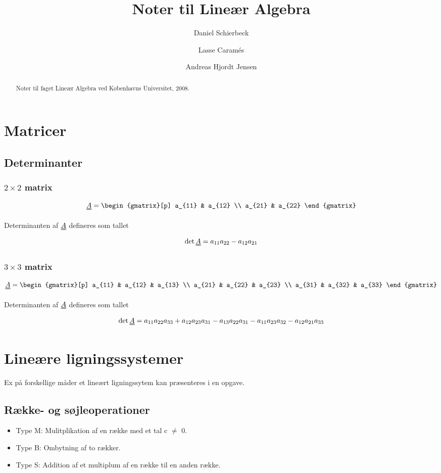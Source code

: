 \documentclass[a4paper]{article}
\title{Noter til Lineær Algebra}
\author{Daniel Schierbeck \and Lasse Caramés \and Andreas Hjordt Jensen}
\newcommand{\mtx}[1]{\uuline{#1}}
\begin{document}
\maketitle

\begin{abstract}
Noter til faget Lineær Algebra ved Københavns Universitet, 2008.
\end{abstract}

\tableofcontents

\section{Matricer}

\subsection{Determinanter}

\subsubsection{$2 \times 2$ matrix}
$$
\mtx{A} =
\begin{gmatrix}[p]
    a_{11} & a_{12} \\
    a_{21} & a_{22}
\end{gmatrix}
$$

Determinanten af $\mtx{A}$ defineres som tallet
$$
\det{\mtx{A}} = a_{11}a_{22} - a_{12}a_{21}
$$


\subsubsection{$3 \times 3$ matrix}
$$
\mtx{A} =
\begin{gmatrix}[p]
    a_{11} & a_{12} & a_{13} \\
    a_{21} & a_{22} & a_{23} \\
    a_{31} & a_{32} & a_{33}
\end{gmatrix}
$$

Determinanten af $\mtx{A}$ defineres som tallet
$$
\det{\mtx{A}} = a_{11}a_{22}a_{33} + a_{12}a_{23}a_{31} - a_{13}a_{22}a_{31} - a_{11}a_{23}a_{32} - a_{12}a_{21}a_{33}
$$

\section{Lineære ligningssystemer}
Ex på forskellige måder et lineært ligningssytem kan præsenteres i en opgave.
\subsection{Række- og søjleoperationer}
\begin{itemize}
  \item Type M: Mulitplikation af en række med et tal c $\neq$ 0.
  \item Type B: Ombytning af to rækker.
  \item Type S: Addition af et multiplum af en række til en anden række.
\end{itemize}
\end{document}
